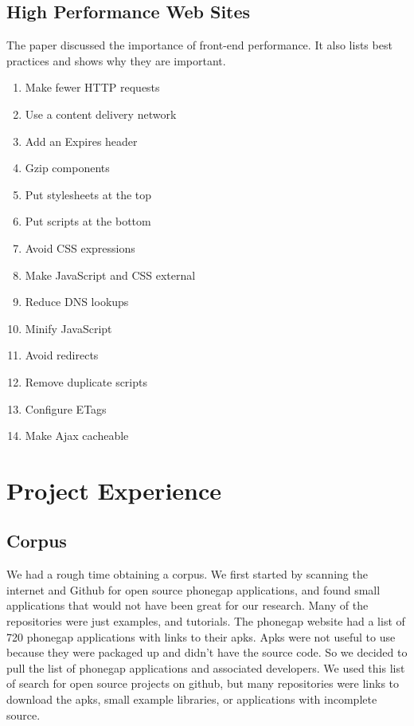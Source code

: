 \documentclass{acm_proc_article-sp}
\begin{document}
\subsection{High Performance Web Sites\cite{souders2008high}}
The paper discussed the importance of front-end performance.
It also lists best practices and shows why they are important.
\vspace{-1.0em}
\begin{enumerate}\itemsep1pt \parskip0pt 
	\item Make fewer HTTP requests
	\item Use a content delivery network
	\item Add an Expires header
	\item Gzip components
	\item Put stylesheets at the top
	\item Put scripts at the bottom
	\item Avoid CSS expressions
	\item Make JavaScript and CSS external
	\item Reduce DNS lookups
	\item Minify JavaScript
	\item Avoid redirects
	\item Remove duplicate scripts
	\item Configure ETags
	\item Make Ajax cacheable
\end{enumerate}

\section{Project Experience}
\subsection{Corpus}
We had a rough time obtaining a corpus. We first started by scanning the internet and Github for open source phonegap applications, and found small applications that would not have been great for our research. Many of the repositories were just examples, and tutorials. The phonegap website had a list of 720 phonegap applications with links to their apks. Apks were not useful to use because they were packaged up and didn't have the source code. So we decided to pull the list of phonegap applications and associated developers. We used this list of search for open source projects on github, but many repositories were links to download the apks, small example libraries, or applications with incomplete source. 
\end{document}
